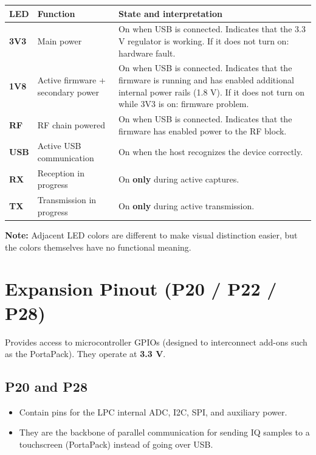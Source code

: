 \documentclass[11pt]{article}
\begin{document}
\begin{table}[h]
    \centering
    \begin{tabular}{p{}p{}p{}}
        \toprule
        \textbf{LED} & \textbf{Function} & \textbf{State and interpretation} \\
        \midrule
        \textbf{3V3} & Main power & On when USB is connected. Indicates that the 3.3 V regulator is working. If it does not turn on: hardware fault. \\
        \addlinespace
        \textbf{1V8} & Active firmware + secondary power & On when USB is connected. Indicates that the firmware is running and has enabled additional internal power rails (1.8 V). If it does not turn on while 3V3 is on: firmware problem. \\
        \addlinespace
        \textbf{RF}  & RF chain powered & On when USB is connected. Indicates that the firmware has enabled power to the RF block. \\
        \addlinespace
        \textbf{USB} & Active USB communication & On when the host recognizes the device correctly. \\
        \addlinespace
        \textbf{RX}  & Reception in progress & On \textbf{only} during active captures. \\
        \addlinespace
        \textbf{TX}  & Transmission in progress & On \textbf{only} during active transmission. \\
        \bottomrule
    \end{tabular}
\end{table}

\textbf{Note:} Adjacent LED colors are different to make visual distinction easier, but the colors themselves have no functional meaning.

\section{Expansion Pinout (P20 / P22 / P28)}

Provides access to microcontroller GPIOs (designed to interconnect add-ons such as the PortaPack). They operate at \textbf{3.3 V}.

\subsection*{P20 and P28}
\begin{itemize}
    \item Contain pins for the LPC internal ADC, I2C, SPI, and auxiliary power.
    \item They are the backbone of parallel communication for sending IQ samples to a touchscreen (PortaPack) instead of going over USB.
\end{itemize}
\end{document}
